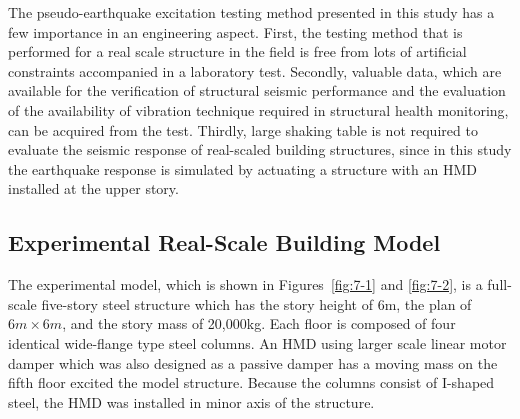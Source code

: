 The pseudo-earthquake excitation testing method presented in this study has a few importance in an engineering aspect. First, the testing method that is performed for a real scale structure in the field is free from lots of artificial constraints accompanied in a laboratory test. Secondly, valuable data, which are available for the verification of structural seismic performance and the evaluation of the availability of vibration technique required in structural health monitoring, can be acquired from the test. Thirdly, large shaking table is not required to evaluate the seismic response of real-scaled building structures, since in this study the earthquake response is simulated by actuating a structure with an HMD installed at the upper story.

\subsection{Experimental Real-Scale Building Model}
The experimental model, which is shown in Figures~\ref{fig:7-1} and \ref{fig:7-2}, is a full-scale five-story steel structure which has the story height of 6m, the plan of $6m\times6m$, and the story mass of 20,000kg. Each floor is composed of four identical wide-flange type steel columns. An HMD using larger scale linear motor damper which was also designed as a passive damper has a moving mass on the fifth floor excited the model structure. Because the columns consist of I-shaped steel, the HMD was installed in minor axis of the structure.

